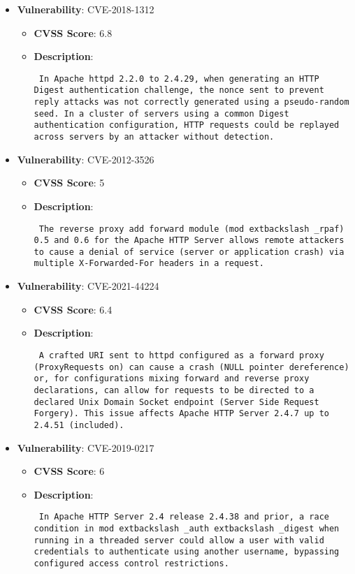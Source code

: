 \documentclass{article}
\begin{document}
\begin{itemize}
        \item \textbf{Vulnerability}: CVE-2018-1312
        \begin{itemize}
            \item \textbf{CVSS Score}:  6.8 
            \item \textbf{Description}: \parbox{\linewidth}{\texttt{ In Apache httpd 2.2.0 to 2.4.29, when generating an HTTP Digest authentication challenge, the nonce sent to prevent reply attacks was not correctly generated using a pseudo-random seed. In a cluster of servers using a common Digest authentication configuration, HTTP requests could be replayed across servers by an attacker without detection. }}
        \end{itemize}
    
        \item \textbf{Vulnerability}: CVE-2012-3526
        \begin{itemize}
            \item \textbf{CVSS Score}:  5 
            \item \textbf{Description}: \parbox{\linewidth}{\texttt{ The reverse proxy add forward module (mod	extbackslash _rpaf) 0.5 and 0.6 for the Apache HTTP Server allows remote attackers to cause a denial of service (server or application crash) via multiple X-Forwarded-For headers in a request. }}
        \end{itemize}
    
        \item \textbf{Vulnerability}: CVE-2021-44224
        \begin{itemize}
            \item \textbf{CVSS Score}:  6.4 
            \item \textbf{Description}: \parbox{\linewidth}{\texttt{ A crafted URI sent to httpd configured as a forward proxy (ProxyRequests on) can cause a crash (NULL pointer dereference) or, for configurations mixing forward and reverse proxy declarations, can allow for requests to be directed to a declared Unix Domain Socket endpoint (Server Side Request Forgery). This issue affects Apache HTTP Server 2.4.7 up to 2.4.51 (included). }}
        \end{itemize}
    
        \item \textbf{Vulnerability}: CVE-2019-0217
        \begin{itemize}
            \item \textbf{CVSS Score}:  6 
            \item \textbf{Description}: \parbox{\linewidth}{\texttt{ In Apache HTTP Server 2.4 release 2.4.38 and prior, a race condition in mod	extbackslash _auth	extbackslash _digest when running in a threaded server could allow a user with valid credentials to authenticate using another username, bypassing configured access control restrictions. }}
        \end{itemize}
    

\end{itemize}
\end{document}
